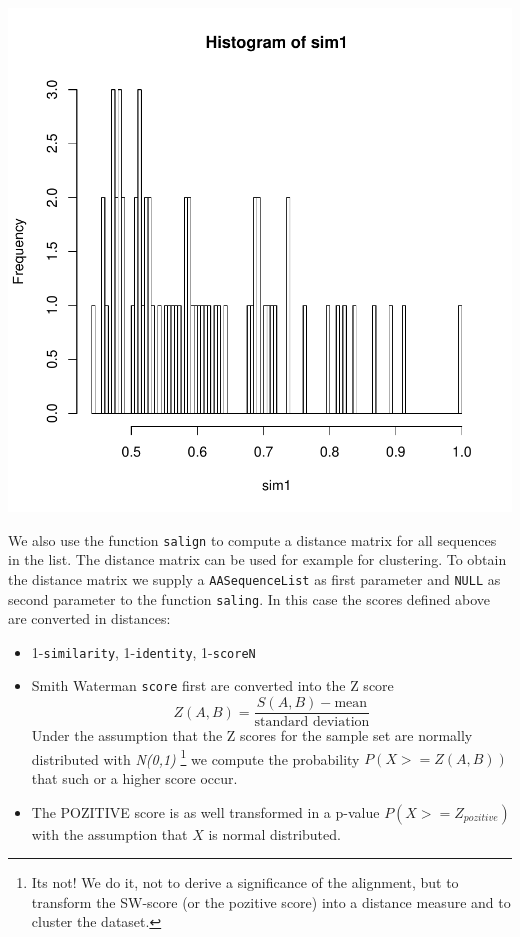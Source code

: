 \documentclass{article}
\begin{document}
\includegraphics{SamplesSession-014}

We also use the function \texttt{salign} to compute a distance matrix for all sequences in the list. The distance matrix can be used for example for clustering. To obtain the distance matrix we supply a \texttt{AASequenceList} as first parameter and \texttt{NULL} as second parameter to the function \texttt{saling}. In this case the scores defined above are converted in distances:

\begin{itemize}
\item 1-\texttt{similarity}, 1-\texttt{identity}, 1-\texttt{scoreN}
\item Smith Waterman \texttt{score} first are converted into the Z score
\begin{equation}
  Z(A,B)=\frac{S(A,B)-\textrm{mean}}{\textrm{standard deviation}}
\end{equation}
Under the assumption that the Z scores for the sample set are normally distributed with {\em N(0,1)} \footnote{Its not\cite{Ving}! We do it, not to derive a significance of the alignment, but to transform the SW-score (or the pozitive score) into a distance measure and to cluster the dataset.} we compute the probability $P(X>= Z(A,B))$ that such or a higher score occur.
\item The POZITIVE score is as well transformed in a p-value $P(X >= Z_{pozitive})$ with the assumption that $X$ is normal distributed. 
\end{itemize}
\end{document}
